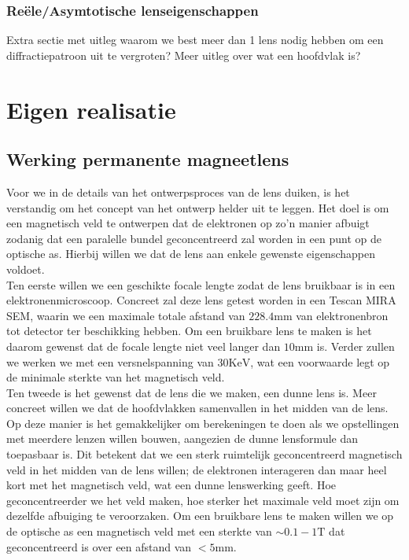 \documentclass[we,twoside,openright,a4paper,11pt]{uantwerpenbamathesis}
\begin{document}
\subsection{Reële/Asymtotische lenseigenschappen}


\color{red} 
Extra sectie met uitleg waarom we best meer dan 1 lens nodig hebben om een diffractiepatroon uit te vergroten?
Meer uitleg over wat een hoofdvlak is? 
\color{black}

\chapter{Eigen realisatie}\label{ch:eigen_realisatie}
\section{Werking permanente magneetlens}
Voor we in de details van het ontwerpsproces van de lens duiken, is het verstandig om het concept van het ontwerp helder uit te leggen. Het doel is om een magnetisch veld te ontwerpen dat de elektronen op zo'n manier afbuigt zodanig dat een paralelle bundel geconcentreerd zal worden in een punt op de optische as. Hierbij willen we dat de lens aan enkele gewenste eigenschappen voldoet.\\

Ten eerste willen we een geschikte focale lengte zodat de lens bruikbaar is in een elektronenmicroscoop. Concreet zal deze lens getest worden in een Tescan MIRA SEM, waarin we een maximale totale afstand van $228.4\mathrm{mm}$ van elektronenbron tot detector ter beschikking hebben. Om een bruikbare lens te maken is het daarom gewenst dat de focale lengte niet veel langer dan $10\mathrm{mm}$ is. Verder zullen we werken we met een versnelspanning van $30\mathrm{KeV}$, wat een voorwaarde legt op de minimale sterkte van het magnetisch veld. \\


Ten tweede is het gewenst dat de lens die we maken, een dunne lens is. Meer concreet willen we dat de hoofdvlakken samenvallen in het midden van de lens. Op deze manier is het gemakkelijker om berekeningen te doen als we opstellingen met meerdere lenzen willen bouwen, aangezien de dunne lensformule dan toepasbaar is. Dit betekent dat we een sterk ruimtelijk geconcentreerd magnetisch veld in het midden van de lens willen; de elektronen interageren dan maar heel kort met het magnetisch veld, wat een dunne lenswerking geeft. Hoe geconcentreerder we het veld maken, hoe sterker het maximale veld moet zijn om dezelfde afbuiging te veroorzaken. Om een bruikbare lens te maken willen we op de optische as een magnetisch veld met een sterkte van $\sim0.1-1\mathrm{T}$ dat geconcentreerd is over een afstand van $<5\mathrm{mm}$. \\
\end{document}
